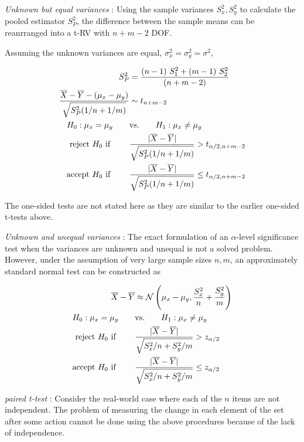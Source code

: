 \textit{Unknown but equal variances} : Using the sample variances $ S_x^2, S_y^2 $ to calculate the pooled estimator $ S_P^2 $, the difference between the sample means can be reanrranged into a t-RV with $ n+m-2 $ DOF.

Assuming the unknown variances are equal, $ \sigma_x^2 = \sigma_y^2 = \sigma^2$,

\begin{align}
	S_P^2 &= \frac{(n-1)\ S_1^2 + (m-1)\ S_2^2}{(n+m-2)} \nonumber \\
	\frac{\displaystyle \overline{X} - \overline{Y} - (\mu_x - \mu_y)}{\displaystyle \sqrt{S_P^2(1/n + 1/m)}} &\sim t_{n+m-2} \nonumber \\
	H_0 : \mu_x = \mu_y \qquad &\text{vs.} \qquad H_1 : \mu_x \neq \mu_y  \nonumber\\
	\text{reject $ H_0 $ if } \qquad & \frac{\displaystyle | \overline{X} - \overline{Y} |}{\displaystyle \sqrt{S_P^2(1/n + 1/m)}} > t_{\alpha/2, n+m-2}  \nonumber \\
	\text{accept $ H_0 $ if } \qquad & \frac{\displaystyle | \overline{X} - \overline{Y} |}{\displaystyle \sqrt{S_P^2(1/n + 1/m)}} \leq t_{\alpha/2, n+m-2}
\end{align}

The one-sided tests are not stated here as they are similar to the earlier one-sided t-tests above.

\textit{Unknown and unequal variances} : The exact formulation of an $ \alpha $-level significance test when the variances are unknown and unequal is not a solved problem. However, under the assumption of very large sample sizes $ n, m $, an approximately standard normal test can be constructed as

\begin{align}
	\overline{X} - \overline{Y} &\approx \mathcal{N}\left( \mu_x - \mu_y, \frac{S_x^2}{n} + \frac{S_y^2}{m} \right) \nonumber \\
	H_0 : \mu_x = \mu_y \qquad &\text{vs.} \qquad H_1 : \mu_x \neq \mu_y \nonumber \\
	\text{reject $ H_0 $ if } \qquad & \frac{\displaystyle | \overline{X} - \overline{Y} |}{\displaystyle \sqrt{S_x^2/n + S_y^2/m}} > z_{\alpha/2} \nonumber \\
	\text{accept $ H_0 $ if } \qquad & \frac{\displaystyle | \overline{X} - \overline{Y} |}{\displaystyle \sqrt{S_x^2/n + S_y^2/m}} \leq z_{\alpha/2}
\end{align}

\textit{paired t-test} : Consider the real-world case where each of the $ n $ items are not independent. The problem of measuring the change in each element of the set after some action cannot be done using the above procedures because of the lack of independence.

